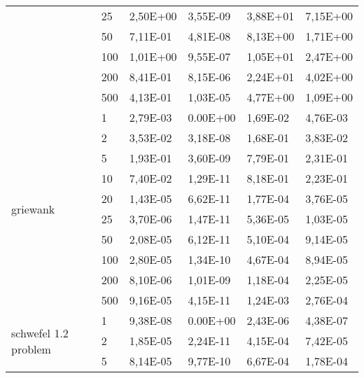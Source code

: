 \begin{longtable}[c]{|p{3.5cm}|l|l|l|l|l|}
                                       & 25        & 2,50E+00 & 3,55E-09 & 3,88E+01 & 7,15E+00 \\ \cline{2-6} 
                                       & 50        & 7,11E-01 & 4,81E-08 & 8,13E+00 & 1,71E+00 \\ \cline{2-6} 
                                       & 100       & 1,01E+00 & 9,55E-07 & 1,05E+01 & 2,47E+00 \\ \cline{2-6} 
                                       & 200       & 8,41E-01 & 8,15E-06 & 2,24E+01 & 4,02E+00 \\ \cline{2-6} 
                                       & 500       & 4,13E-01 & 1,03E-05 & 4,77E+00 & 1,09E+00 \\ \hline
\multirow[t]{10}{*}{griewank}             & 1         & 2,79E-03 & 0.00E+00 & 1,69E-02 & 4,76E-03 \\ \cline{2-6} 
                                       & 2         & 3,53E-02 & 3,18E-08 & 1,68E-01 & 3,83E-02 \\ \cline{2-6} 
                                       & 5         & 1,93E-01 & 3,60E-09 & 7,79E-01 & 2,31E-01 \\ \cline{2-6} 
                                       & 10        & 7,40E-02 & 1,29E-11 & 8,18E-01 & 2,23E-01 \\ \cline{2-6} 
                                       & 20        & 1,43E-05 & 6,62E-11 & 1,77E-04 & 3,76E-05 \\ \cline{2-6} 
                                       & 25        & 3,70E-06 & 1,47E-11 & 5,36E-05 & 1,03E-05 \\ \cline{2-6} 
                                       & 50        & 2,08E-05 & 6,12E-11 & 5,10E-04 & 9,14E-05 \\ \cline{2-6} 
                                       & 100       & 2,80E-05 & 1,34E-10 & 4,67E-04 & 8,94E-05 \\ \cline{2-6} 
                                       & 200       & 8,10E-06 & 1,01E-09 & 1,18E-04 & 2,25E-05 \\ \cline{2-6} 
                                       & 500       & 9,16E-05 & 4,15E-11 & 1,24E-03 & 2,76E-04 \\ \hline
\multirow[t]{10}{*}{schwefel 1.2 problem} & 1         & 9,38E-08 & 0.00E+00 & 2,43E-06 & 4,38E-07 \\ \cline{2-6} 
                                       & 2         & 1,85E-05 & 2,24E-11 & 4,15E-04 & 7,42E-05 \\ \cline{2-6} 
                                       & 5         & 8,14E-05 & 9,77E-10 & 6,67E-04 & 1,78E-04 \\ \cline{2-6} 

\end{longtable}
